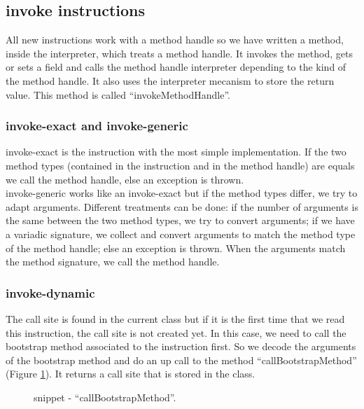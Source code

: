 \documentclass{sig-alternate}
\begin{document}
    \subsection{invoke instructions}
      All new instructions work with a method handle so we have written a method, inside the interpreter, which treats a method handle.
      It invokes the method, gets or sets a field and calls the method handle interpreter depending to the kind of the method handle.
      It also uses the interpreter mecanism to store the return value.
      This method is called ``invokeMethodHandle''.

    \subsubsection{invoke-exact and invoke-generic}
      invoke-exact is the instruction with the most simple implementation.
      If the two method types (contained in the instruction and in the method handle) are equals we call the method handle,
      else an exception is thrown.\\
      
      invoke-generic works like an invoke-exact but if the method types differ, we try to adapt arguments.
      Different treatments can be done:
      if the number of arguments is the same between the two method types, we try to convert arguments;
      if we have a variadic signature, we collect and convert arguments to match the method type of the method handle;
      else an exception is thrown.
      When the arguments match the method signature, we call the method handle.
  
    \subsubsection{invoke-dynamic}
      The call site is found in the current class but if it is the first time that we read this instruction, the call site is not created yet.
      In this case, we need to call the bootstrap method associated to the instruction first.
      So we decode the arguments of the bootstrap method and do an up call to the method ``callBootstrapMethod'' (Figure \ref{implBSM}).
      It returns a call site that is stored in the class.

      \begin{figure}[!h]
        \centering \vspace{-1.5em}
        \caption{snippet - ``callBootstrapMethod''.}
        \label{implBSM}
      \end{figure}
\end{document}
